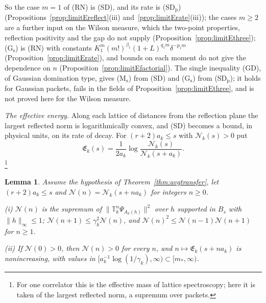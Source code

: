 \documentclass[aps,prd,twocolumn,superscriptaddress,nofootinbib,longbibliography,floatfix,amsmath,amssymb,10pt]{revtex4-2}
\newtheorem{lemma}[theorem]{Lemma}
\theoremstyle{definition}
\theoremstyle{remark}
\begin{document}
So the case $m=1$ of (RN) is (SD), and its rate is (SD$_{\mathrm p}$)
(Propositions~\ref{prop:limitEreflect}(iii) and~\ref{prop:limitErate}(iii));
the cases $m\ge2$ are a further input on the Wilson measure, which the
two-point properties, reflection positivity and the gap do not supply
(Proposition~\ref{prop:limitEthree}); (G$_{\mathrm s}$) is (RN) with
constants $K_1^m(m!)^{\beta_1}(1+L)^{q_1m}\delta^{-p_1m}$
(Proposition~\ref{prop:limitErate}), and bounds on each moment do not give
the dependence on $n$ (Proposition~\ref{prop:limitEfactorial}). The single
inequality (GD), of Gaussian domination type, gives (M$_{\mathrm s}$) from
(SD) and (G$_{\mathrm s}$) from (SD$_{\mathrm p}$); it holds for Gaussian
packets, fails in the fields of Proposition~\ref{prop:limitEthree}, and is not
proved here for the Wilson measure.

\emph{The effective energy.} Along each lattice of distances from the
reflection plane the largest reflected norm is logarithmically convex, and
(SD) becomes a bound, in physical units, on its rate of decay. For
$(r+2)a_k\le s$ with $\mathcal N_k(s)>0$ put
\[
\mathfrak E_k(s)=\frac1{2a_k}\log\frac{\mathcal N_k(s)}{\mathcal N_k(s+a_k)} .
\]\footnote{For one correlator this is the effective mass of lattice
spectroscopy; here it is taken of the largest reflected norm, a supremum over
packets.}

\begin{lemma}\label{lem:limitElogconvex}
Assume the hypothesis of Theorem~\textup{\ref{thm:avgtransfer}}, let
$(r+2)a_k\le s$ and $\mathcal N(n)=\mathcal N_k(s+na_k)$ for integers $n\ge0$.

\textup{(i)} $\mathcal N(n)$ is the supremum of $\|\mathbb T_k^n
\Psi_{A_k(h)}\|^2$ over $h$ supported in $B_s$ with $\|h\|_\infty\le1$;
$\mathcal N(n+1)\le\gamma_k^2\mathcal N(n)$, and $\mathcal N(n)^2\le
\mathcal N(n-1)\mathcal N(n+1)$ for $n\ge1$.

\textup{(ii)} If $\mathcal N(0)>0$, then $\mathcal N(n)>0$ for every $n$, and
$n\mapsto\mathfrak E_k(s+na_k)$ is nonincreasing, with values in
$[a_k^{-1}\log(1/\gamma_k),\infty)\subset[m_*,\infty)$.
\end{lemma}
\end{document}
